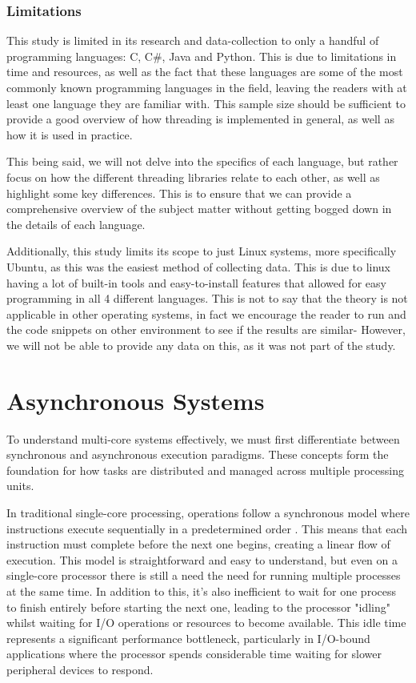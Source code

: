 \documentclass[12pt,a4paper]{article}
\begin{document}
\subsubsection{Limitations}

This study is limited in its research and data-collection to only a handful of programming languages: C, C\#, Java and Python. This is due to limitations in time and resources, as well as the fact that these languages are some of the most commonly known programming languages in the field, leaving the readers with at least one language they are familiar with. This sample size should be sufficient to provide a good overview of how threading is implemented in general, as well as how it is used in practice. 

This being said, we will not delve into the specifics of each language, but rather focus on how the different threading libraries relate to each other, as well as highlight some key differences. This is to ensure that we can provide a comprehensive overview of the subject matter without getting bogged down in the details of each language.

Additionally, this study limits its scope to just Linux systems, more specifically Ubuntu, as this was the easiest method of collecting data. This is due to linux having a lot of built-in tools and easy-to-install features that allowed for easy programming in all 4 different languages. This is not to say that the theory is not applicable in other operating systems, in fact we encourage the reader to run and the code snippets on other environment to see if the results are similar- However, we will not be able to provide any data on this, as it was not part of the study.

\section{Asynchronous Systems}

To understand multi-core systems effectively, we must first differentiate between synchronous and asynchronous execution paradigms. These concepts form the foundation for how tasks are distributed and managed across multiple processing units.

In traditional single-core processing, operations follow a synchronous model where instructions execute sequentially in a predetermined order \parencite[p. 118]{Johnson2015}. This means that each instruction must complete before the next one begins, creating a linear flow of execution. This model is straightforward and easy to understand, but even on a single-core processor there is still a need the need for running multiple processes at the same time. In addition to this, it's also inefficient to wait for one process to finish entirely before starting the next one, leading to the processor "idling" whilst waiting for I/O operations or resources to become available. This idle time represents a significant performance bottleneck, particularly in I/O-bound applications where the processor spends considerable time waiting for slower peripheral devices to respond.
\end{document}
